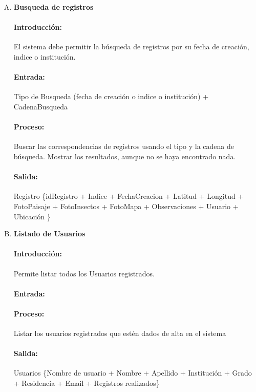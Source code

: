 \begin{enumerate}[A.]
         \item \textbf{Busqueda de registros}
        
        \paragraph{Introducción:} El sistema debe permitir la búsqueda de registros por su fecha de creación, indice o institución.
        \paragraph{Entrada:} Tipo de Busqueda (fecha de creación o indice o institución) + CadenaBusqueda
        
        \paragraph{Proceso:} Buscar las correspondencias de registros usando el tipo y la cadena de búsqueda. Mostrar los resultados, aunque no se haya encontrado nada.
        
        \paragraph{Salida:} Registro \{idRegistro + Indice + FechaCreacion + Latitud + Longitud + FotoPaisaje + FotoInsectos + FotoMapa + Observaciones + Usuario + Ubicación \}
        
        \item \textbf{Listado de Usuarios}
        
        \paragraph{Introducción:} Permite listar todos los Usuarios registrados.
        
        \paragraph{Entrada:}
        
        \paragraph{Proceso:} Listar los usuarios registrados que estén dados de alta en el sistema
        
        \paragraph{Salida:} Usuarios \{Nombre de usuario + Nombre + Apellido + Institución + Grado + Residencia + Email + Registros realizados\}


\end{enumerate}
